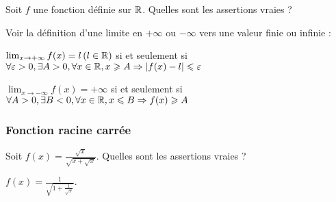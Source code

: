 \begin{question} 
Soit  $f$ une fonction définie sur $\mathbb{R}$. Quelles sont les assertions vraies ?
\begin{answers}

    
    
       
    
\end{answers}
\begin{explanations}
Voir la définition d'une limite en $+\infty$ ou $-\infty$ vers une valeur finie ou infinie :

$\lim_{x\to +\infty} f(x)=l \, (l\in \mathbb{R})$  si et seulement si $\forall \varepsilon >0,  \exists A >0, \forall x \in \mathbb{R}, x\geqslant A \Rightarrow |f(x)-l|\leqslant \varepsilon$

$\lim_{x\to -\infty} f(x)=+\infty$  si et seulement si $ \forall A >0,  \exists B <0, \forall x \in \mathbb{R}, x\leqslant B \Rightarrow f(x)\geqslant A$
\end{explanations}

\end{question}


\subsubsection{Fonction racine carrée}

\begin{question} 
Soit $f(x)= \frac{\sqrt x}{\sqrt{x+\sqrt{x}}}$. Quelles sont les assertions vraies ?
\begin{answers}

    
    
    
    


\end{answers}
\begin{explanations}
$f(x)= \frac{1}{\sqrt{1+\frac{1}{\sqrt{x}}}}.$
\end{explanations}

\end{question}




